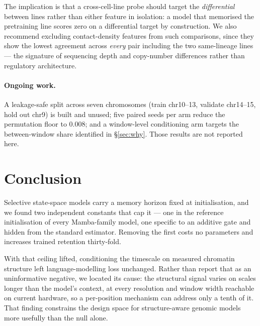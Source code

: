 \documentclass[10pt]{article}
\begin{document}
The implication is that a cross-cell-line probe should target the
\emph{differential} between lines rather than either feature in isolation: a
model that memorised the pretraining line scores zero on a differential target
by construction. We also recommend excluding contact-density features from such
comparisons, since they show the lowest agreement across \emph{every} pair
including the two same-lineage lines --- the signature of sequencing depth and
copy-number differences rather than regulatory architecture.

\paragraph{Ongoing work.} A leakage-safe split across seven chromosomes (train
chr10--13, validate chr14--15, hold out chr9) is built and unused; five paired
seeds per arm reduce the permutation floor to $0.008$; and a window-level
conditioning arm targets the between-window share identified in
\S\ref{sec:why}. Those results are not reported here.

\section{Conclusion}

Selective state-space models carry a memory horizon fixed at initialisation, and
we found two independent constants that cap it --- one in the reference
initialisation of every Mamba-family model, one specific to an additive gate and
hidden from the standard estimator. Removing the first costs no parameters and
increases trained retention thirty-fold.

With that ceiling lifted, conditioning the timescale on measured chromatin
structure left language-modelling loss unchanged. Rather than report that as an
uninformative negative, we located its cause: the structural signal varies on
scales longer than the model's context, at every resolution and window width
reachable on current hardware, so a per-position mechanism can address only a
tenth of it. That finding constrains the design space for structure-aware
genomic models more usefully than the null alone.
\end{document}
